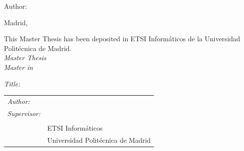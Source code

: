 \begin{titlepage}
\vspace*{0.5cm}
\begin{center}
\huge\bfseries {  \TituloTFM{} } 
\end{center}

\vspace*{5cm}

\noindent
\large{Author: \NombreAutor{} }\\


\vspace*{4cm}
\begin{center}
Madrid, \fecha
\end{center}

\newpage
\thispagestyle{empty}
\noindent
This Master Thesis has been deposited in ETSI Informáticos de la Universidad Politécnica de Madrid. \\

\vspace*{4cm}
\noindent
\textit{Master Thesis} \\
\textit{Master in} \Master{}


\textit{Title:} \TituloTFM{} \\
\Date


\vspace*{7cm}

\noindent
\begin{tabular}{ll}
\textit{Author:} & \NombreAutor{}  \\ 
\textit{Supervisor:} & \NombreTutor{}  \\ 
                & \Departamento{} \\
                & ETSI Informáticos\\
                & Universidad Politécnica de Madrid
\end{tabular} 

\end{titlepage}

